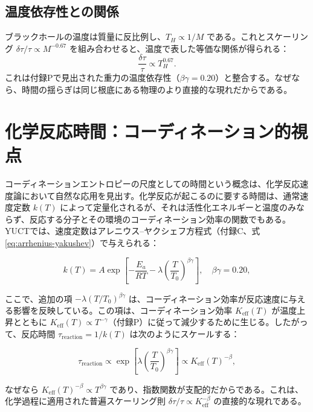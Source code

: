 \documentclass[12pt,a4paper]{article}
\newcommand{\Keff}{K_{\mathrm{eff}}}
\begin{document}
	\subsection{温度依存性との関係}
	
	ブラックホールの温度は質量に反比例し、\(T_H \propto 1/M\) である。これとスケーリング \(\delta\tau/\tau \propto M^{-0.67}\) を組み合わせると、温度で表した等価な関係が得られる：
	\begin{equation}
		\frac{\delta\tau}{\tau} \propto T_H^{0.67}.
	\end{equation}
	これは付録Pで見出された重力の温度依存性（\(\beta\gamma = 0.20\)）と整合する。なぜなら、時間の揺らぎは同じ根底にある物理のより直接的な現れだからである。
	
	\section{化学反応時間：コーディネーション的視点}
	\label{sec:chemistry}
	
	コーディネーションエントロピーの尺度としての時間という概念は、化学反応速度論において自然な応用を見出す。化学反応が起こるのに要する時間は、通常速度定数 \(k(T)\) によって定量化されるが、それは活性化エネルギーと温度のみならず、反応する分子とその環境のコーディネーション効率の関数でもある。YUCTでは、速度定数はアレニウス–ヤクシェフ方程式（付録C、式 \ref{eq:arrhenius-yakushev}）で与えられる：
	
	\begin{equation}
		k(T) = A \exp\left[-\frac{E_a}{RT} - \lambda \left(\frac{T}{T_0}\right)^{\beta\gamma}\right], \quad \beta\gamma = 0.20,
	\end{equation}
	
	ここで、追加の項 \(-\lambda (T/T_0)^{\beta\gamma}\) は、コーディネーション効率が反応速度に与える影響を反映している。この項は、コーディネーション効率 \(\Keff(T)\) が温度上昇とともに \(\Keff(T) \propto T^{-\gamma}\)（付録P）に従って減少するために生じる。したがって、反応時間 \(\tau_{\mathrm{reaction}} = 1/k(T)\) は次のようにスケールする：
	
	\begin{equation}
		\tau_{\mathrm{reaction}} \propto \exp\left[\lambda \left(\frac{T}{T_0}\right)^{\beta\gamma}\right] \propto \Keff(T)^{-\beta},
	\end{equation}
	
	なぜなら \(\Keff(T)^{-\beta} \propto T^{\beta\gamma}\) であり、指数関数が支配的だからである。これは、化学過程に適用された普遍スケーリング則 \(\delta \tau / \tau \propto \Keff^{-\beta}\) の直接的な現れである。
	
\end{document}
